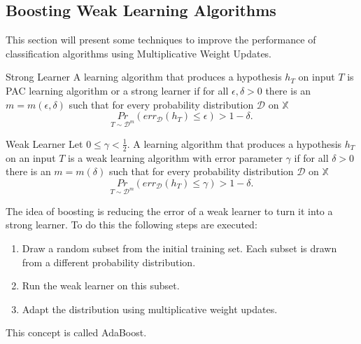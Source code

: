 \documentclass[english]{panikzettel}
\begin{document}

\subsection{Boosting Weak Learning Algorithms}
This section will present some techniques to improve the performance of classification algorithms using Multiplicative Weight Updates.

\begin{halfboxl}
\vspace{-\baselineskip}
\begin{defi}{Strong Learner}
A learning algorithm that produces a hypothesis $h_T$ on input $T$ is PAC learning algorithm or a strong learner if for all $\epsilon,\delta>0$ there is an $m=m(\epsilon,\delta)$ such that for every probability distribution $\mathcal{D}$ on $\mathbb{X}$
\[
\underset{T\sim \mathcal{D}^m}{Pr} (err_\mathcal{D}(h_T)\leq \epsilon) > 1-\delta.
\]
\end{defi}
\end{halfboxl}
\begin{halfboxr}
\vspace{-\baselineskip}
\begin{defi}{Weak Learner}
Let $0\leq \gamma<\frac{1}{2}$. A learning algorithm that produces a hypothesis $h_T$ on an input $T$ is a weak learning algorithm with error parameter $\gamma$ if for all $\delta > 0$ there is an $m=m(\delta)$ such that for every probability distribution $\mathcal{D}$ on $\mathbb{X}$
\[
\underset{T\sim \mathcal{D}^m}{Pr} (err_\mathcal{D}(h_T)\leq \gamma) > 1-\delta.
\]
\end{defi}
\end{halfboxr}

The idea of boosting is reducing the error of a weak learner to turn it into a strong learner. To do this the following steps are executed:
\begin{enumerate}
\item Draw a random subset from the initial training set. Each subset is drawn from a different probability distribution.
\item Run the weak learner on this subset.
\item Adapt the distribution using multiplicative weight updates.
\end{enumerate}
This concept is called AdaBoost.
\end{document}

